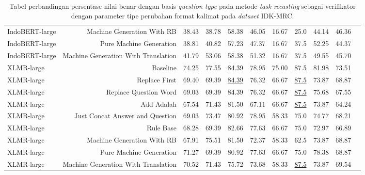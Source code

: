 \begin{table}[H]
\begin{tabular}{lrrrrrrrrrr}
IndoBERT-large &Machine Generation With RB &38.43 &38.78 &58.38 &46.05 &16.67 &25.0 &44.14 &46.36 \\
IndoBERT-large &Pure Machine Generation &38.81 &40.82 &57.23 &47.37 &16.67 &37.5 &52.25 &44.37 \\
IndoBERT-large &Machine Generation With Translation &41.79 &53.06 &58.38 &51.32 &16.67 &37.5 &49.55 &45.70 \\
\hline
XLMR-large &Baseline &\underline{74.25} &\underline{77.55} &\underline{84.39} &\underline{78.95} &\underline{75.00} &\underline{87.5} &\underline{81.98} &\underline{73.51} \\
XLMR-large &Replace First &69.40 &69.39 &\underline{84.39} &76.32 &66.67 &\underline{87.5} &73.87 &68.87 \\
XLMR-large &Replace Question Word &69.03 &69.39 &84.39 &76.32 &66.67 &\underline{87.5} &75.68 &67.55 \\
XLMR-large &Add Adalah &67.54 &71.43 &81.50 &67.11 &66.67 &\underline{87.5} &73.87 &64.24 \\
XLMR-large &Just Concat Answer and Question &69.03 &73.47 &80.92 &\underline{78.95} &58.33 &75.0 &74.77 &68.21 \\
XLMR-large &Rule Base &68.28 &69.39 &82.66 &77.63 &66.67 &75.0 &72.97 &66.89 \\
XLMR-large &Machine Generation With RB &67.91 &75.51 &81.50 &72.37 &58.33 &62.5 &73.87 &68.87 \\
XLMR-large &Pure Machine Generation &71.27 &69.39 &80.92 &77.63 &66.67 &75.0 &78.38 &68.87 \\
XLMR-large &Machine Generation With Translation &70.52 &71.43 &75.72 &73.68 &58.33 &\underline{87.5} &73.87 &69.54 \\
\bottomrule
\end{tabular}
\caption{Tabel perbandingan persentase nilai benar dengan basis \emph{question type} pada metode \emph{task recasting} sebagai verifikator dengan parameter tipe perubahan format kalimat pada \emph{dataset} IDK-MRC.}
\end{table}

